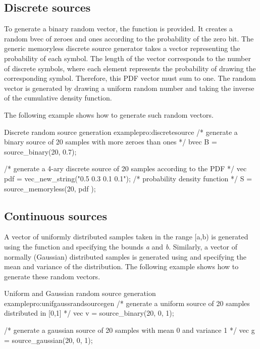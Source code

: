 \subsection{Discrete sources}
\label{sec:discretesources}

    To generate a binary random vector, the function 
     is provided. It
    creates a random bvec of zeroes and ones according to the
    probability of the zero bit. The generic memoryless discrete
    source generator takes a vector representing the probability of
    each symbol. The length of the vector corresponds to the number of
    discrete symbols, where each element represents the probability of
    drawing the corresponding symbol. Therefore, this PDF vector must
    sum to one. The random vector is generated by drawing a uniform
    random number and taking the inverse of the cumulative density
    function.

    The following example shows how to generate such random vectors.

\begin{program}{Discrete random source generation example}{pro:discretesource}
/* generate a binary source of 20 samples with more zeroes than ones */
bvec B = source_binary(20, 0.7);

/* generate a 4-ary discrete source of 20 samples according to the PDF */
vec pdf = vec_new_string("0.5 0.3 0.1 0.1"); /* probability density function */
S = source_memoryless(20, pdf );
\end{program}


\subsection{Continuous sources}

A vector of uniformly distributed samples taken in the range [a,b) is
generated using the function  and specifying
the bounds \emph{a} and
\emph{b}. Similarly, a vector of normally (Gaussian)
distributed samples is generated using 
 and specifying
the mean and variance of the distribution. The following example shows
how to generate these random vectors.

\begin{program}{Uniform and Gaussian random source generation example}{pro:unifgaussrandsourcegen}
/* generate a uniform source of 20 samples distributed in [0,1] */
vec v = source_binary(20, 0, 1);

/* generate a gaussian source of 20 samples with mean 0 and variance 1 */
vec g = source_gaussian(20, 0, 1);
\end{program}


